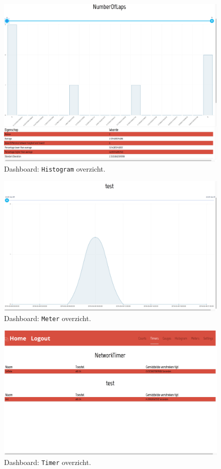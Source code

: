 \begin{figure}[!h]
  \centering
  \includegraphics[scale=0.2]{Afbeeldingen/Implementatie/Histogram}
  \caption{Dashboard: \texttt{Histogram} overzicht.}
  \label{fig:DasbhoardHistogram}
\end{figure}

\begin{figure}[!h]
  \centering
  \includegraphics[scale=0.2]{Afbeeldingen/Implementatie/Meter}
  \caption{Dashboard: \texttt{Meter} overzicht.}
  \label{fig:DasbhoardMeter}
\end{figure}

\begin{figure}[!h]
  \centering
  \includegraphics[scale=0.2]{Afbeeldingen/Implementatie/Timer}
  \caption{Dashboard: \texttt{Timer} overzicht.}
  \label{fig:DasbhoardTimer}
\end{figure}

